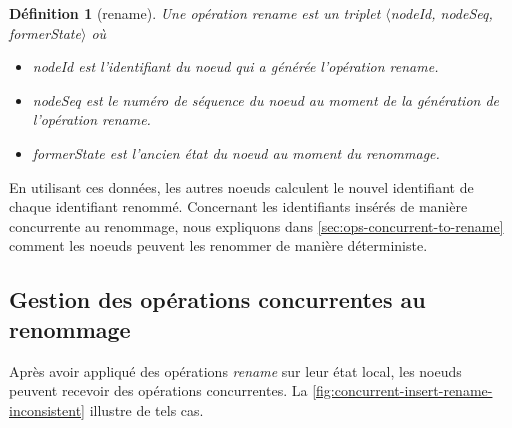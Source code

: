 \documentclass[12pt]{thesul}
\newtheorem{definition}{Définition}
\begin{document}
\begin{definition}[rename]
  \label{def:rename-op}
  Une opération \emph{rename} est un triplet $\langle$nodeId, nodeSeq, formerState$\rangle$ où
  \begin{itemize}
    \item nodeId est l'identifiant du noeud qui a générée l'opération \emph{rename}.
    \item nodeSeq est le numéro de séquence du noeud au moment de la génération de l'opération \emph{rename}.
    \item formerState est l'ancien état du noeud au moment du renommage.
  \end{itemize}
\end{definition}

En utilisant ces données, les autres noeuds calculent le nouvel identifiant de chaque identifiant renommé.
Concernant les identifiants insérés de manière concurrente au renommage, nous expliquons dans \autoref{sec:ops-concurrent-to-rename} comment les noeuds peuvent les renommer de manière déterministe.

\subsection{Gestion des opérations concurrentes au renommage}

\label{sec:ops-concurrent-to-rename}

Après avoir appliqué des opérations \emph{rename} sur leur état local, les noeuds peuvent recevoir des opérations concurrentes.
La \autoref{fig:concurrent-insert-rename-inconsistent} illustre de tels cas.
\end{document}
